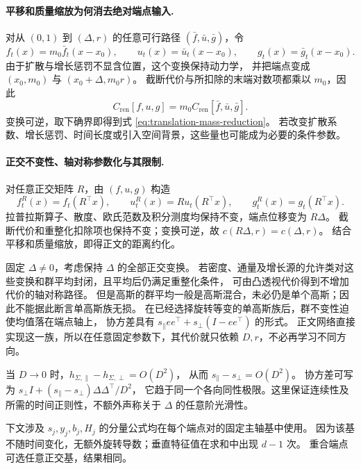 \documentclass[UTF8,a4paper,11pt,fontset=fandol]{ctexart}
\begin{document}
\paragraph{平移和质量缩放为何消去绝对端点输入.}
对从 $(0,1)$ 到 $(\Delta,r)$ 的任意可行路径 $(\bar f,\bar u,\bar g)$，令
\begin{equation}
f_t(x)=m_0\bar f_t(x-x_0),\qquad
u_t(x)=\bar u_t(x-x_0),\qquad g_t(x)=\bar g_t(x-x_0).
\end{equation}
由于扩散与增长惩罚不显含位置，这个变换保持动力学，
并把端点变成 $(x_0,m_0)$ 与 $(x_0+\Delta,m_0r)$。
截断代价与所扣除的末端对数项都乘以 $m_0$，因此
\begin{equation}
C_{\mathrm{ren}}[f,u,g]=m_0C_{\mathrm{ren}}[\bar f,\bar u,\bar g].
\end{equation}
变换可逆，取下确界即得到式 \eqref{eq:translation-mass-reduction}。
若改变扩散系数、增长惩罚、时间长度或引入空间背景，这些量也可能成为必要的条件参数。

\paragraph{正交不变性、轴对称参数化与其限制.}
对任意正交矩阵 $R$，由 $(f,u,g)$ 构造
\begin{equation}
f_t^R(x)=f_t(R^\top x),\qquad
u_t^R(x)=Ru_t(R^\top x),\qquad g_t^R(x)=g_t(R^\top x).
\end{equation}
拉普拉斯算子、散度、欧氏范数及积分测度均保持不变，端点位移变为 $R\Delta$。
截断代价和重整化扣除项也保持不变；变换可逆，故 $c(R\Delta,r)=c(\Delta,r)$。
结合平移和质量缩放，即得正文的距离约化。

固定 $\Delta\ne0$，考虑保持 $\Delta$ 的全部正交变换。
若密度、通量及增长源的允许类对这些变换和群平均封闭，且平均后仍满足重整化条件，
可由凸透视代价得到不增加代价的轴对称路径。
但是高斯的群平均一般是高斯混合，未必仍是单个高斯；因此不能据此断言单高斯族无损。
在已经选择旋转等变的单高斯族后，群不变性迫使均值落在端点轴上，
协方差具有 $s_\parallel ee^\top+s_\perp(I-ee^\top)$ 的形式。
正文网络直接实现这一族，所以在任意固定参数下，其代价就只依赖 $D,r$，不必再学习不同方向。

当 $D\to0$ 时，$h_{\Sigma,\parallel}-h_{\Sigma,\perp}=O(D^2)$，
从而 $s_\parallel-s_\perp=O(D^2)$。
协方差可写为 $s_\perp I+(s_\parallel-s_\perp)\Delta\Delta^\top/D^2$，
它趋于同一个各向同性极限。这里保证连续性及所需的时间正则性，不额外声称关于 $\Delta$ 的任意阶光滑性。

下文涉及 $s_j,y_j,b_j,H_j$ 的分量公式均在每个端点对的固定主轴基中使用。
因为该基不随时间变化，无额外旋转导数；垂直特征值在求和中出现 $d-1$ 次。
重合端点可选任意正交基，结果相同。
\end{document}
